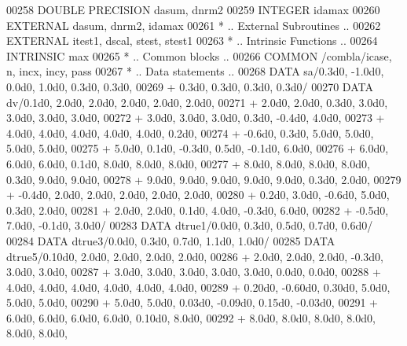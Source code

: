 \begin{DoxyCode}
00258       \textcolor{keywordtype}{DOUBLE PRECISION}  dasum, dnrm2
00259       \textcolor{keywordtype}{INTEGER}           idamax
00260       \textcolor{keywordtype}{EXTERNAL}          dasum, dnrm2, idamax
00261 \textcolor{comment}{*     .. External Subroutines ..}
00262       \textcolor{keywordtype}{EXTERNAL}          itest1, dscal, stest, stest1
00263 \textcolor{comment}{*     .. Intrinsic Functions ..}
00264       \textcolor{keywordtype}{INTRINSIC}         max
00265 \textcolor{comment}{*     .. Common blocks ..}
00266       \textcolor{keyword}{COMMON}            /combla/icase, n, incx, incy, pass
00267 \textcolor{comment}{*     .. Data statements ..}
00268       \textcolor{keyword}{DATA}              sa/0.3d0, -1.0d0, 0.0d0, 1.0d0, 0.3d0, 0.3d0,
00269      +                  0.3d0, 0.3d0, 0.3d0, 0.3d0/
00270       \textcolor{keyword}{DATA}              dv/0.1d0, 2.0d0, 2.0d0, 2.0d0, 2.0d0, 2.0d0,
00271      +                  2.0d0, 2.0d0, 0.3d0, 3.0d0, 3.0d0, 3.0d0, 3.0d0,
00272      +                  3.0d0, 3.0d0, 3.0d0, 0.3d0, -0.4d0, 4.0d0,
00273      +                  4.0d0, 4.0d0, 4.0d0, 4.0d0, 4.0d0, 0.2d0,
00274      +                  -0.6d0, 0.3d0, 5.0d0, 5.0d0, 5.0d0, 5.0d0,
00275      +                  5.0d0, 0.1d0, -0.3d0, 0.5d0, -0.1d0, 6.0d0,
00276      +                  6.0d0, 6.0d0, 6.0d0, 0.1d0, 8.0d0, 8.0d0, 8.0d0,
00277      +                  8.0d0, 8.0d0, 8.0d0, 8.0d0, 0.3d0, 9.0d0, 9.0d0,
00278      +                  9.0d0, 9.0d0, 9.0d0, 9.0d0, 9.0d0, 0.3d0, 2.0d0,
00279      +                  -0.4d0, 2.0d0, 2.0d0, 2.0d0, 2.0d0, 2.0d0,
00280      +                  0.2d0, 3.0d0, -0.6d0, 5.0d0, 0.3d0, 2.0d0,
00281      +                  2.0d0, 2.0d0, 0.1d0, 4.0d0, -0.3d0, 6.0d0,
00282      +                  -0.5d0, 7.0d0, -0.1d0, 3.0d0/
00283       \textcolor{keyword}{DATA}              dtrue1/0.0d0, 0.3d0, 0.5d0, 0.7d0, 0.6d0/
00284       \textcolor{keyword}{DATA}              dtrue3/0.0d0, 0.3d0, 0.7d0, 1.1d0, 1.0d0/
00285       \textcolor{keyword}{DATA}              dtrue5/0.10d0, 2.0d0, 2.0d0, 2.0d0, 2.0d0,
00286      +                  2.0d0, 2.0d0, 2.0d0, -0.3d0, 3.0d0, 3.0d0,
00287      +                  3.0d0, 3.0d0, 3.0d0, 3.0d0, 3.0d0, 0.0d0, 0.0d0,
00288      +                  4.0d0, 4.0d0, 4.0d0, 4.0d0, 4.0d0, 4.0d0,
00289      +                  0.20d0, -0.60d0, 0.30d0, 5.0d0, 5.0d0, 5.0d0,
00290      +                  5.0d0, 5.0d0, 0.03d0, -0.09d0, 0.15d0, -0.03d0,
00291      +                  6.0d0, 6.0d0, 6.0d0, 6.0d0, 0.10d0, 8.0d0,
00292      +                  8.0d0, 8.0d0, 8.0d0, 8.0d0, 8.0d0, 8.0d0,

\end{DoxyCode}
